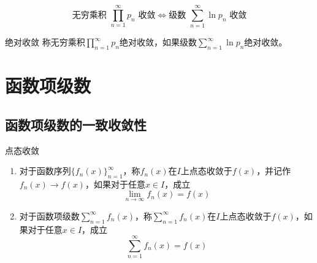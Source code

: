 \documentclass[lang = cn, scheme = chinese, thmcnt = section]{elegantbook}
\newcommand{\dis}{\displaystyle}
\begin{document}
\begin{theorem}
	$$
	\text{无穷乘积 }\prod_{n=1}^{\infty}p_n\text{ 收敛}
	\iff
	\text{级数 }\sum_{n=1}^{\infty}\ln p_n\text{ 收敛}
	$$
\end{theorem}

\begin{definition}{绝对收敛}
	称无穷乘积$\dis \prod_{n=1}^{\infty}p_n$绝对收敛，如果级数$\dis \sum_{n=1}^{\infty}\ln p_n$绝对收敛。
\end{definition}

\chapter{函数项级数}

\section{函数项级数的一致收敛性}

\begin{definition}{点态收敛}
	\begin{enumerate}
		\item 对于函数序列$\{f_n(x)\}_{n=1}^{\infty}$，称$f_n(x)$在$I$上点态收敛于$f(x)$，并记作$f_n(x)\rightarrow f(x)$，如果对于任意$x\in I$，成立
		$$
		\lim_{n\to\infty}f_n(x)=f(x)
		$$
		\item 对于函数项级数$\dis\sum_{n=1}^{\infty}f_n(x)$，称$\dis\sum_{n=1}^{\infty}f_n(x)$在$I$上点态收敛于$f(x)$，如果对于任意$x\in I$，成立
		$$
		\sum_{n=1}^{\infty}f_n(x)=f(x)
		$$
	\end{enumerate}
\end{definition}
\end{document}
